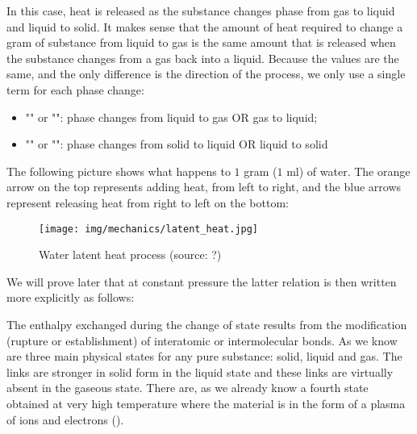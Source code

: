 	In this case, heat is released as the substance changes phase from gas to liquid and liquid to solid.  It makes sense that the amount of heat required to change a gram of substance from liquid to gas is the same amount that is released when the substance changes from a gas back into a liquid.  Because the values are the same, and the only difference is the direction of the process, we only use a single term for each phase change:
	\begin{itemize}
		\item "" or "": phase changes from liquid to gas OR gas to liquid;
		\item ""  or "": phase changes from solid to liquid OR liquid to solid
	\end{itemize}
	
	The following picture shows what happens to $1$ gram ($1$ ml) of water. The orange arrow on the top represents adding heat, from left to right, and the blue arrows represent releasing heat from right to left on the bottom:
	\begin{figure}[H]
		\centering
		\texttt{[image: img/mechanics/latent\_heat.jpg]}
		\caption{Water latent heat process (source: ?)}
	\end{figure}
	
	We will prove later that at constant pressure the latter relation is then written more explicitly as follows:
	
	The enthalpy exchanged during the change of state results from the modification (rupture or establishment) of interatomic or intermolecular bonds. As we know are three main physical states for any pure substance: solid, liquid and gas. The links are stronger in solid form in the liquid state and these links are virtually absent in the gaseous state. There are, as we already know a fourth state obtained at very high temperature where the material is in the form of a plasma of ions and electrons ().
	
